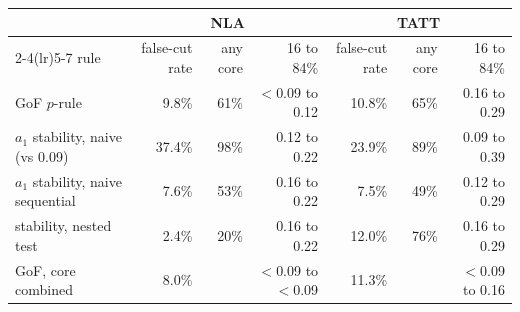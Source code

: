 \begin{tabular}{l rrr rrr}\toprule
 & \multicolumn{3}{c}{NLA} & \multicolumn{3}{c}{TATT}\\ \cmidrule(lr){2-4}\cmidrule(lr){5-7}
rule & false-cut rate & any core & 16 to 84\% & false-cut rate & any core & 16 to 84\%\\ \midrule
GoF $p$-rule & 9.8\% & 61\% & $<$0.09 to 0.12 & 10.8\% & 65\% & 0.16 to 0.29\\
$a_1$ stability, naive (vs 0.09) & 37.4\% & 98\% & 0.12 to 0.22 & 23.9\% & 89\% & 0.09 to 0.39\\
$a_1$ stability, naive sequential & 7.6\% & 53\% & 0.16 to 0.22 & 7.5\% & 49\% & 0.12 to 0.29\\
stability, nested test & 2.4\% & 20\% & 0.16 to 0.22 & 12.0\% & 76\% & 0.16 to 0.29\\
\midrule
GoF, core combined & 8.0\% &  & $<$0.09 to $<$0.09 & 11.3\% &  & $<$0.09 to 0.16\\
\bottomrule\end{tabular}